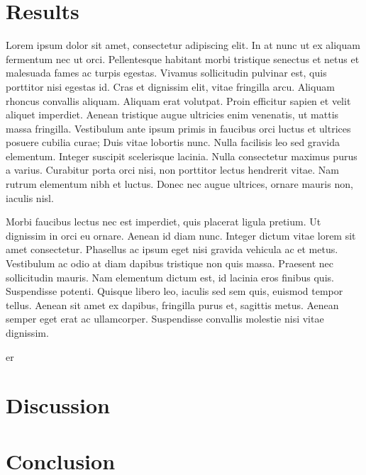 \chapter{Results}

Lorem ipsum dolor sit amet, consectetur adipiscing elit. In at nunc ut ex aliquam fermentum nec ut orci. Pellentesque habitant morbi tristique senectus et netus et malesuada fames ac turpis egestas. Vivamus sollicitudin pulvinar est, quis porttitor nisi egestas id. Cras et dignissim elit, vitae fringilla arcu. Aliquam rhoncus convallis aliquam. Aliquam erat volutpat. Proin efficitur sapien et velit aliquet imperdiet. Aenean tristique augue ultricies enim venenatis, ut mattis massa fringilla. Vestibulum ante ipsum primis in faucibus orci luctus et ultrices posuere cubilia curae; Duis vitae lobortis nunc. Nulla facilisis leo sed gravida elementum. Integer suscipit scelerisque lacinia. Nulla consectetur maximus purus a varius. Curabitur porta orci nisi, non porttitor lectus hendrerit vitae. Nam rutrum elementum nibh et luctus. Donec nec augue ultrices, ornare mauris non, iaculis nisl.

Morbi faucibus lectus nec est imperdiet, quis placerat ligula pretium. Ut dignissim in orci eu ornare. Aenean id diam nunc. Integer dictum vitae lorem sit amet consectetur. Phasellus ac ipsum eget nisi gravida vehicula ac et metus. Vestibulum ac odio at diam dapibus tristique non quis massa. Praesent nec sollicitudin mauris. Nam elementum dictum est, id lacinia eros finibus quis. Suspendisse potenti. Quisque libero leo, iaculis sed sem quis, euismod tempor tellus. Aenean sit amet ex dapibus, fringilla purus et, sagittis metus. Aenean semper eget erat ac ullamcorper. Suspendisse convallis molestie nisi vitae dignissim.

\gls{er}

\chapter{Discussion}

\chapter{Conclusion}
\label{sec:conclusion}

